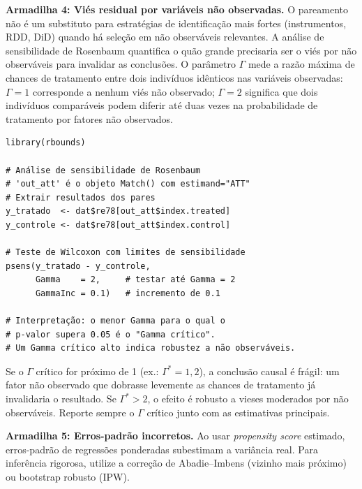\documentclass[12pt,a4paper]{article}
\begin{document}
\textbf{Armadilha 4: Viés residual por variáveis não observadas.} O pareamento não é um substituto para estratégias de identificação mais fortes (instrumentos, RDD, DiD) quando há seleção em não observáveis relevantes. A análise de sensibilidade de Rosenbaum \citep{RosenbaumRubin1983sensitiv} quantifica o quão grande precisaria ser o viés por não observáveis para invalidar as conclusões. O parâmetro $\Gamma$ mede a razão máxima de chances de tratamento entre dois indivíduos idênticos nas variáveis observadas: $\Gamma = 1$ corresponde a nenhum viés não observado; $\Gamma = 2$ significa que dois indivíduos comparáveis podem diferir até duas vezes na probabilidade de tratamento por fatores não observados.

\begin{lstlisting}[style=Rstyle]
library(rbounds)

# Análise de sensibilidade de Rosenbaum
# 'out_att' é o objeto Match() com estimand="ATT"
# Extrair resultados dos pares
y_tratado  <- dat$re78[out_att$index.treated]
y_controle <- dat$re78[out_att$index.control]

# Teste de Wilcoxon com limites de sensibilidade
psens(y_tratado - y_controle,
      Gamma    = 2,     # testar até Gamma = 2
      GammaInc = 0.1)   # incremento de 0.1

# Interpretação: o menor Gamma para o qual o
# p-valor supera 0.05 é o "Gamma crítico".
# Um Gamma crítico alto indica robustez a não observáveis.
\end{lstlisting}

\begin{notabox}
Se o $\Gamma$ crítico for próximo de 1 (ex.: $\Gamma^* = 1{,}2$), a conclusão causal é frágil: um fator não observado que dobrasse levemente as chances de tratamento já invalidaria o resultado. Se $\Gamma^* > 2$, o efeito é robusto a vieses moderados por não observáveis. Reporte sempre o $\Gamma$ crítico junto com as estimativas principais.
\end{notabox}

\textbf{Armadilha 5: Erros-padrão incorretos.} Ao usar \textit{propensity score} estimado, erros-padrão de regressões ponderadas subestimam a variância real. Para inferência rigorosa, utilize a correção de Abadie--Imbens (vizinho mais próximo) ou bootstrap robusto (IPW).
\end{document}
